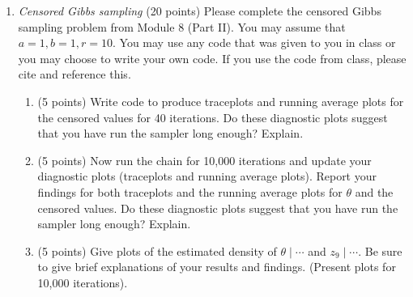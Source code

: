 \documentclass{article}
\begin{document}
\begin{enumerate}
\item \emph{Censored Gibbs sampling} (20 points) Please complete the censored Gibbs sampling problem from Module 8 (Part II). You may assume that $a=1,b=1, r=10.$ You may use any code that was given to you in class or you may choose to write your own code. If you use the code from class, please cite and reference this.

\begin{enumerate}
\item (5 points) Write code to produce traceplots and running average plots for the censored values for 40 iterations. Do these diagnostic plots suggest that you have run the sampler long enough? Explain. 

\item (5 points) Now run the chain for 10,000 iterations  and update your diagnostic plots (traceplots and running average plots). Report your findings for both traceplots and the running average plots for $\theta$ and the censored values. Do these diagnostic plots suggest that you have run the sampler long enough? Explain. 

\item (5 points) Give plots of the estimated density of $\theta \mid \cdots$ and $z_9 \mid \cdots$. Be sure to give brief explanations of your results and findings. (Present plots for 10,000 iterations). 


\end{enumerate}
\end{enumerate}
\end{document}
